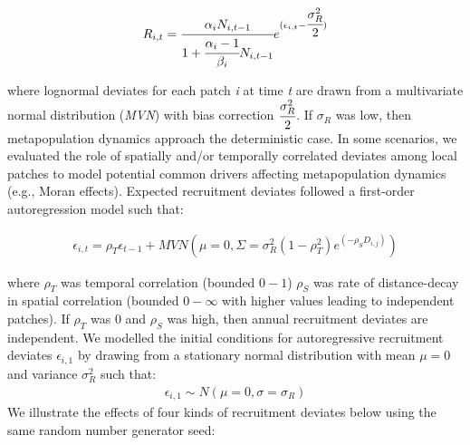 \documentclass[
]{article}
\begin{document}
\begin{align}
R_{i,t}=\cfrac{\alpha_iN_{i,t-1}}{1+\cfrac{\alpha_i-1}{\beta_i}N_{i,t-1}}e^{(\epsilon_{i,t}-\cfrac{\sigma_{R}^2}{2})}
\end{align}

where lognormal deviates for each patch \emph{i} at time \emph{t} are
drawn from a multivariate normal distribution (\emph{MVN}) with bias
correction \(\cfrac{\sigma_{R}^2}{2}\). If \(\sigma_R\) was low, then
metapopulation dynamics approach the deterministic case. In some
scenarios, we evaluated the role of spatially and/or temporally
correlated deviates among local patches to model potential common
drivers affecting metapopulation dynamics (e.g., Moran effects).
Expected recruitment deviates followed a first-order autoregression
model such that:

\begin{align}
\epsilon_{i,t}=\rho_T\epsilon_{t-1}+MVN(\mu=0,\Sigma=\sigma_R^2(1-\rho_T^2)e^{(-\rho_SD_{i,j})})
\end{align}

where \(\rho_T\) was temporal correlation (bounded \(0-1\)) \(\rho_S\)
was rate of distance-decay in spatial correlation (bounded \(0-\infty\)
with higher values leading to independent patches). If \(\rho_T\) was 0
and \(\rho_S\) was high, then annual recruitment deviates are
independent. We modelled the initial conditions for autoregressive
recruitment deviates \(\epsilon_{i,1}\) by drawing from a stationary
normal distribution with mean \(\mu=0\) and variance \(\sigma_R^2\) such
that: \begin{align}
\epsilon_{i,1} \sim N(\mu=0,\sigma=\sigma_R)
\end{align} We illustrate the effects of four kinds of recruitment
deviates below using the same random number generator seed:
\end{document}
